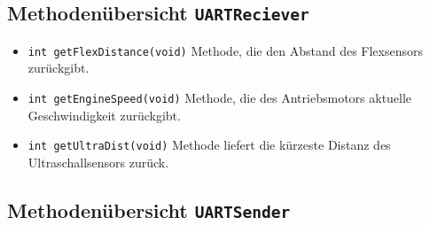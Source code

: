 \documentclass[a4paper, 10pt, fleqn]{article}
\newcommand{\code}[1]{\texttt{#1}}
\begin{document}
\subsection{Methodenübersicht \code{UARTReciever}}
\begin{itemize}
\item \code{int getFlexDistance(void)} Methode, die den Abstand des Flexsensors zurückgibt.
\item \code{int getEngineSpeed(void)} Methode, die des Antriebsmotors aktuelle Geschwindigkeit zurückgibt.
\item \code{int getUltraDist(void)} Methode liefert die kürzeste Distanz des Ultraschallsensors zurück.
\end{itemize}
\subsection{Methodenübersicht \code{UARTSender}}
\end{document}
